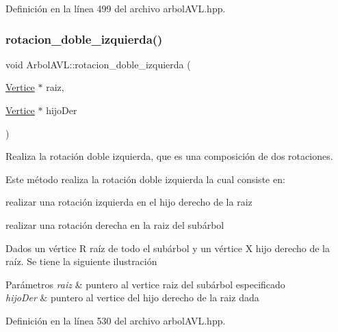 Definición en la línea 499 del archivo arbol\+A\+V\+L.\+hpp.

\mbox{\label{classArbolAVL_a3115c59bd2be761c530eeeb11a169700}} 
\subsubsection{\texorpdfstring{rotacion\+\_\+doble\+\_\+izquierda()}{rotacion\_doble\_izquierda()}\hspace{0.1cm}{\footnotesize\ttfamily [2/2]}}
{\footnotesize\ttfamily void Arbol\+A\+V\+L\+::rotacion\+\_\+doble\+\_\+izquierda (\begin{DoxyParamCaption}\item[{\hyperlink{classVertice}{Vertice} $\ast$}]{raiz,  }\item[{\hyperlink{classVertice}{Vertice} $\ast$}]{hijo\+Der }\end{DoxyParamCaption})}



Realiza la rotación doble izquierda, que es una composición de dos rotaciones. 

Este método realiza la rotación doble izquierda la cual consiste en\+:
\begin{DoxyItemize}
\item realizar una rotación izquierda en el hijo derecho de la raiz
\item realizar una rotación derecha en la raiz del subárbol
\end{DoxyItemize}

Dados un vértice R raíz de todo el subárbol y un vértice X hijo derecho de la raíz. Se tiene la siguiente ilustración ~\newline
  
\begin{DoxyParams}{Parámetros}
{\em raiz} & puntero al vertice raiz del subárbol especificado \\
\hline
{\em hijo\+Der} & puntero al vertice del hijo derecho de la raiz dada \\
\hline
\end{DoxyParams}


Definición en la línea 530 del archivo arbol\+A\+V\+L.\+hpp.

\mbox{\label{classArbolAVL_aedfb7658eb4f826aeba3fb98f50483e6}} 
